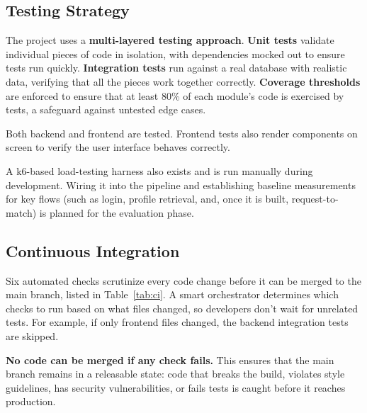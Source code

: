\subsection{Testing Strategy}
The project uses a \textbf{multi-layered testing approach}. \textbf{Unit tests}
validate individual pieces of code in isolation, with dependencies mocked out to
ensure tests run quickly. \textbf{Integration tests} run against a real database
with realistic data, verifying that all the pieces work together correctly.
\textbf{Coverage thresholds} are enforced to ensure that at least 80\% of each
module's code is exercised by tests, a safeguard against untested edge cases.

Both backend and frontend are tested. Frontend tests also render components on
screen to verify the user interface behaves correctly.

A k6-based load-testing harness also exists and is run manually during
development. Wiring it into the pipeline and establishing baseline measurements
for key flows (such as login, profile retrieval, and, once it is built,
request-to-match) is planned for the evaluation phase.

\subsection{Continuous Integration}
Six automated checks scrutinize every code change before it can be merged to the
main branch, listed in Table~\ref{tab:ci}. A smart orchestrator determines which
checks to run based on what files changed, so developers don't wait for unrelated
tests. For example, if only frontend files changed, the backend integration tests
are skipped.

\textbf{No code can be merged if any check fails.} This ensures that the main
branch remains in a releasable state: code that breaks the build, violates style
guidelines, has security vulnerabilities, or fails tests is caught before it
reaches production.

\begin{table}[ht]
	\centering
	\caption{Continuous-integration workflows.}
	\label{tab:ci}
\end{table}

